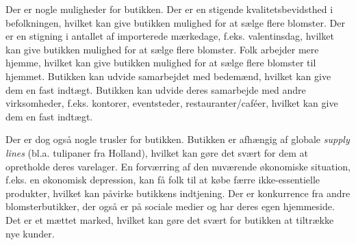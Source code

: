 Der er nogle muligheder for butikken. Der er en stigende kvalitetsbevidsthed i befolkningen, hvilket kan give butikken mulighed for at sælge flere blomster.
Der er en stigning i antallet af importerede mærkedage, f.eks. valentinsdag, hvilket kan give butikken mulighed for at sælge flere blomster.
Folk arbejder mere hjemme, hvilket kan give butikken mulighed for at sælge flere blomster til hjemmet.
Butikken kan udvide samarbejdet med bedemænd, hvilket kan give dem en fast indtægt.
Butikken kan udvide deres samarbejde med andre virksomheder, f.eks. kontorer, eventsteder, restauranter/caféer, hvilket kan give dem en fast indtægt.

Der er dog også nogle trusler for butikken. Butikken er afhængig af globale \emph{supply lines} (bl.a. tulipaner fra Holland), hvilket kan gøre det svært for dem at opretholde deres varelager.
En forværring af den nuværende økonomiske situation, f.eks. en økonomisk depression, kan få folk til at købe færre ikke-essentielle produkter, hvilket kan påvirke butikkens indtjening.
Der er konkurrence fra andre blomsterbutikker, der også er på sociale medier og har deres egen hjemmeside.
Det er et mættet marked, hvilket kan gøre det svært for butikken at tiltrække nye kunder.

